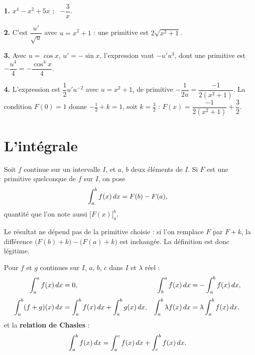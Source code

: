 \begin{corrige}
\textbf{1.} $x^{4}-x^{2}+5x$ ; \ $-\dfrac{3}{x}$.

\textbf{2.} C'est $\dfrac{u'}{\sqrt{u}}$ avec $u = x^{2}+1$ : une primitive est
$2\sqrt{x^{2}+1}$.

\textbf{3.} Avec $u = \cos x$, $u' = -\sin x$, l'expression vaut $-u'u^{3}$,
dont une primitive est $-\dfrac{u^{4}}{4} = -\dfrac{\cos^{4}x}{4}$.

\textbf{4.} L'expression est $\dfrac{1}{2}u'u^{-2}$ avec $u = x^{2}+1$, de
primitive $-\dfrac{1}{2u} = \dfrac{-1}{2(x^{2}+1)}$. La condition $F(0)=1$
donne $-\tfrac12+k=1$, soit $k = \tfrac32$ :
$F(x) = \dfrac{-1}{2(x^{2}+1)} + \dfrac{3}{2}$.
\end{corrige}

\section{L'intégrale}

\begin{definition}
Soit $f$ continue sur un intervalle $I$, et $a$, $b$ deux éléments de $I$. Si
$F$ est une primitive quelconque de $f$ sur $I$, on pose
\[
  \int_{a}^{b} f(x)\,dx = F(b)-F(a),
\]
quantité que l'on note aussi $\bigl[F(x)\bigr]_{a}^{b}$.
\end{definition}

\begin{remarque}
Le résultat ne dépend pas de la primitive choisie : si l'on remplace $F$ par
$F+k$, la différence $\bigl(F(b)+k\bigr)-\bigl(F(a)+k\bigr)$ est inchangée. La
définition est donc légitime.
\end{remarque}

\begin{propriete}
Pour $f$ et $g$ continues sur $I$, $a$, $b$, $c$ dans $I$ et $\lambda$ réel :
\begin{align*}
  \int_{a}^{a} f(x)\,dx &= 0, &
  \int_{b}^{a} f(x)\,dx &= -\int_{a}^{b} f(x)\,dx, \\[0.3em]
  \int_{a}^{b} (f+g)(x)\,dx
    &= \int_{a}^{b} f(x)\,dx + \int_{a}^{b} g(x)\,dx, &
  \int_{a}^{b} \lambda f(x)\,dx &= \lambda \int_{a}^{b} f(x)\,dx,
\end{align*}
et la \textbf{relation de Chasles} :
\[
  \int_{a}^{b} f(x)\,dx = \int_{a}^{c} f(x)\,dx + \int_{c}^{b} f(x)\,dx .
\]
\end{propriete}

